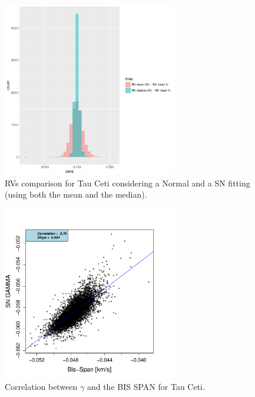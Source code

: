 \documentclass[11pt, oneside]{article}
\begin{document}
{%
%
\begin{figure}[htbp]
   \centering
\includegraphics[height = 3in]{[0]TauCeti_HistogramsDiff.pdf} 
   \caption{RVs comparison for Tau Ceti considering a Normal and a SN fitting (using both the mean and the median).}
   \label{fig:Tau Ceti:RV}
\end{figure}
%
\begin{figure}[htbp]
   \centering
\includegraphics[height = 3in]{HD10700_[2]gamma_vs_bisspan.pdf} 
   \caption{Correlation between $\gamma$ and the BIS SPAN for Tau Ceti.}
   \label{fig:Tau:corr.gamma}
\end{figure}
%


}
\end{document}
